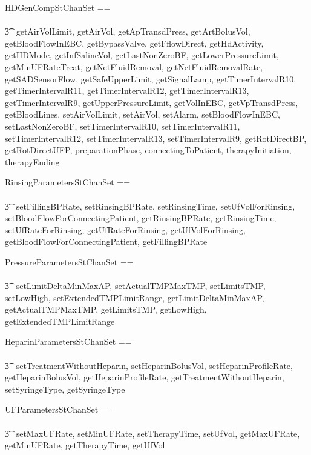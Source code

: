 \begin{circus}
  \circchanset HDGenCompStChanSet ==\\
  \\\t3 \lchanset~getAirVolLimit, getAirVol,
  getApTransdPress, getArtBolusVol,
  getBloodFlowInEBC, getBypassValve,
  getFflowDirect, getHdActivity,
  getHDMode, getInfSalineVol,
  getLastNonZeroBF, getLowerPressureLimit,
  getMinUFRateTreat, getNetFluidRemoval,
  getNetFluidRemovalRate, getSADSensorFlow,
  getSafeUpperLimit, getSignalLamp,
  getTimerIntervalR10, getTimerIntervalR11,
  getTimerIntervalR12, getTimerIntervalR13,
  getTimerIntervalR9, getUpperPressureLimit,
  getVolInEBC, getVpTransdPress,
  getBloodLines, setAirVolLimit,
  setAirVol, setAlarm,
  setBloodFlowInEBC, setLastNonZeroBF,
  setTimerIntervalR10, setTimerIntervalR11,
  setTimerIntervalR12, setTimerIntervalR13,
  setTimerIntervalR9, getRotDirectBP,
  getRotDirectUFP, preparationPhase,
  connectingToPatient, therapyInitiation,
  therapyEnding~\rchanset
\end{circus}
\begin{circus}
  \circchanset RinsingParametersStChanSet ==\\
  \\\t3 \lchanset~setFillingBPRate, setRinsingBPRate,
  setRinsingTime, setUfVolForRinsing,
  setBloodFlowForConnectingPatient,
  getRinsingBPRate, getRinsingTime,
  setUfRateForRinsing, getUfRateForRinsing,
  getUfVolForRinsing,
  getBloodFlowForConnectingPatient,
  getFillingBPRate~\rchanset
\end{circus}
\begin{circus}
  \circchanset PressureParametersStChanSet ==\\
  \\\t3 \lchanset~setLimitDeltaMinMaxAP, setActualTMPMaxTMP,
  setLimitsTMP, setLowHigh,
  setExtendedTMPLimitRange, getLimitDeltaMinMaxAP,
  getActualTMPMaxTMP, getLimitsTMP,
  getLowHigh, getExtendedTMPLimitRange ~\rchanset
\end{circus}
\begin{circus}
  \circchanset HeparinParametersStChanSet ==\\
  \\\t3 \lchanset~setTreatmentWithoutHeparin,
  setHeparinBolusVol, setHeparinProfileRate,
  getHeparinBolusVol, getHeparinProfileRate,
  getTreatmentWithoutHeparin, setSyringeType,
  getSyringeType~\rchanset
\end{circus}
\begin{circus}
  \circchanset UFParametersStChanSet ==\\
  \\\t3 \lchanset~setMaxUFRate, setMinUFRate,
  setTherapyTime, setUfVol,
  getMaxUFRate, getMinUFRate,
  getTherapyTime, getUfVol~\rchanset
\end{circus}
